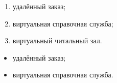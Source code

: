 \begin{enumerate}
  \item[а)] удалённый заказ;
  \item[б)] виртуальная справочная служба;
  \item[в)] виртуальный читальный зал.
\end{enumerate}

\begin{itemize}
  \item удалённый заказ;
  \item виртуальная справочная служба.
\end{itemize}
